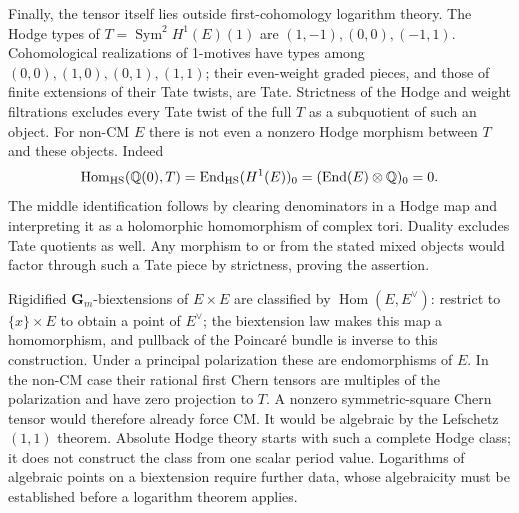 Finally, the tensor itself lies outside first-cohomology logarithm
theory.  The Hodge types of $T=\operatorname{Sym}^2H^1(E)(1)$ are
$(1,-1),(0,0),(-1,1)$.  Cohomological realizations of 1-motives have
types among $(0,0),(1,0),(0,1),(1,1)$; their even-weight graded
pieces, and those of finite extensions of their Tate twists, are Tate.
Strictness of the Hodge and weight filtrations excludes every Tate
twist of the full $T$ as a subquotient of such an object.  For non-CM
$E$ there is not even a nonzero Hodge morphism between $T$ and these
objects.  Indeed
\[
 \operatorname{Hom}_{\mathrm{HS}}(\mathbb Q(0),T)
   =\operatorname{End}_{\mathrm{HS}}(H^1(E))_0
   =(\operatorname{End}(E)\otimes\mathbb Q)_0=0.
\]
The middle identification follows by clearing denominators in a Hodge
map and interpreting it as a holomorphic homomorphism of complex tori.
Duality excludes Tate quotients as well.  Any morphism to or from the
stated mixed objects would factor through such a Tate piece by
strictness, proving the assertion.

Rigidified $\mathbf G_m$-biextensions of $E\times E$ are classified
by $\operatorname{Hom}(E,E^\vee)$: restrict to $\{x\}\times E$ to
obtain a point of $E^\vee$; the biextension law makes this map a
homomorphism, and pullback of the Poincar\'e bundle is inverse to this
construction.  Under a principal polarization these are endomorphisms
of $E$.  In the non-CM case their rational first Chern tensors are
multiples of the polarization and have zero projection to $T$.
A nonzero symmetric-square Chern tensor would therefore already force
CM.  It would be algebraic by the Lefschetz $(1,1)$ theorem.  Absolute
Hodge theory starts with such a complete Hodge class; it does not
construct the class from one scalar period value.  Logarithms of
algebraic points on a biextension require further data, whose
algebraicity must be established before a logarithm theorem applies.
